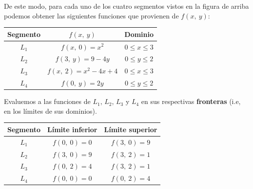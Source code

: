 \documentclass[12pt]{article}
\begin{document}
\begin{figure}[hbt!]
\centering


\end{figure}

De este modo, para cada uno de los cuatro segmentos vistos en la figura de arriba podemos obtener las siguientes funciones que provienen de $f(x, \ y)$:

\begin{table}[hbt!]
\centering

\begin{tabular}{c c c}
Segmento & $f(x, \ y)$ & Dominio \\
\hline
$L_{1}$ & $f(x, \ 0) = x^{2}$ & $0 \leq x \leq 3$ \\
$L_{2}$ & $f(3, \ y) = 9 - 4y$ & $0 \leq y \leq 2$ \\
$L_{3}$ & $f(x, \ 2) = x^{2} - 4x + 4$ & $0 \leq x \leq 3$ \\
$L_{4}$ & $f(0, \ y) = 2y$ & $0 \leq y \leq 2$
\end{tabular}

\end{table}

Evaluemos a las funciones de $L_{1}$, $L_{2}$, $L_{3}$ y $L_{4}$ en sus respectivas \textbf{fronteras} (i.e, en los límites de sus dominios).

\begin{table}[hbt!]
\centering

\begin{tabular}{c c c}
Segmento & Límite inferior & Límite superior \\
\hline
$L_{1}$ & $f(0, \ 0) = 0$ & $f(3, \ 0) = 9$ \\
$L_{2}$ & $f(3, \ 0) = 9$ & $f(3, \ 2) = 1$ \\
$L_{3}$ & $f(0, \ 2) = 4$ & $f(3, \ 2) = 1$ \\
$L_{4}$ & $f(0, \ 0) = 0$ & $f(0, \ 2) = 4$
\end{tabular}

\end{table}
\end{document}
